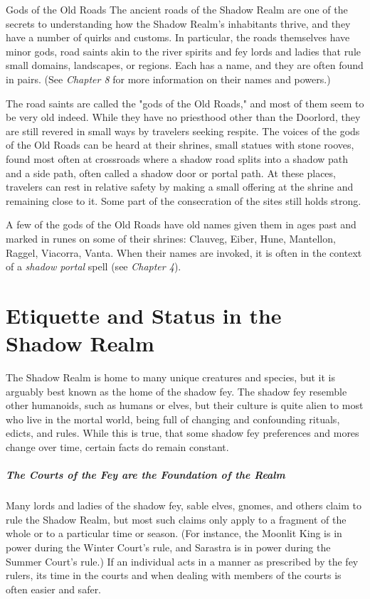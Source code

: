 \documentclass[10pt,a4paper,twoside,bg=print,twocolumn,openany,nodeprecatedcode]{dndbook}
\begin{document}
\begin{DndSidebar}[float=!b]{Gods of the Old Roads}
The ancient roads of the Shadow Realm are one of the secrets to understanding how the Shadow Realm's inhabitants thrive, and they have a number of quirks and customs. In particular, the roads themselves have minor gods, road saints akin to the river spirits and fey lords and ladies that rule small domains, landscapes, or regions. Each has a name, and they are often found in pairs. (See \textit{Chapter 8} for more information on their names and powers.)



The road saints are called the "gods of the Old Roads," and most of them seem to be very old indeed. While they have no priesthood other than the Doorlord, they are still revered in small ways by travelers seeking respite. The voices of the gods of the Old Roads can be heard at their shrines, small statues with stone rooves, found most often at crossroads where a shadow road splits into a shadow path and a side path, often called a shadow door or portal path. At these places, travelers can rest in relative safety by making a small offering at the shrine and remaining close to it. Some part of the consecration of the sites still holds strong.



A few of the gods of the Old Roads have old names given them in ages past and marked in runes on some of their shrines: Clauveg, Eiber, Hune, Mantellon, Raggel, Viacorra, Vanta. When their names are invoked, it is often in the context of a \textit{shadow portal} spell (see \textit{Chapter 4}).



\end{DndSidebar}

\section{Etiquette and Status in the Shadow Realm}
The Shadow Realm is home to many unique creatures and species, but it is arguably best known as the home of the shadow fey. The shadow fey resemble other humanoids, such as humans or elves, but their culture is quite alien to most who live in the mortal world, being full of changing and confounding rituals, edicts, and rules. While this is true, that some shadow fey preferences and mores change over time, certain facts do remain constant.

\subparagraph{The Courts of the Fey are the Foundation of the Realm}
Many lords and ladies of the shadow fey, sable elves, gnomes, and others claim to rule the Shadow Realm, but most such claims only apply to a fragment of the whole or to a particular time or season. (For instance, the Moonlit King is in power during the Winter Court's rule, and Sarastra is in power during the Summer Court's rule.) If an individual acts in a manner as prescribed by the fey rulers, its time in the courts and when dealing with members of the courts is often easier and safer.
\end{document}
